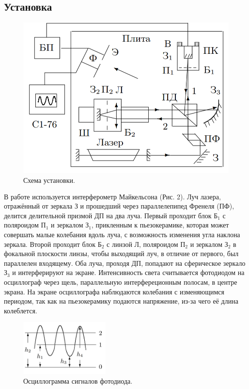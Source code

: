 \documentclass[a4paper,12pt]{article}
\begin{document}
\subsection*{Установка}
\begin{figure}[h]
\includegraphics[scale=0.55]{2.png}
\centering
\caption{Схема установки.}
\end{figure}
В работе используется интерферометр Майкельсона (Рис. 2). Луч лазера, отражённый от зеркала З и прошедший через параллелепипед Френеля (ПФ), делится делительной призмой ДП на два луча. Первый проходит блок $\text{Б}_1$ с поляроидом $\text{П}_1$ и зеркалом $\text{З}_1$, прикленным к пьезокерамике, которая может совершать малые колебания вдоль луча, с возможность изменения угла наклона зеркала. Второй проходит блок $\text{Б}_2$ с линзой Л, поляроидом $\text{П}_2$ и зеркалом $\text{З}_2$ в фокальной плоскости линзы, чтобы выходящий луч, в отличие от первого, был параллелен входящему. Оба луча, проходя ДП, попадают на сферическое зеркало $\text{З}_3$ и интерферируют на экране. Интенсивность света считывается фотодиодом на осциллограф через щель, параллельную интерфереционным полосам, в центре экрана. На экране осциллографа наблюдаются колебания с изменяющимся периодом, так как на пьезокерамику подаются напряжение, из-за чего её длина колеблется.
\begin{figure}
\begin{center}
\includegraphics[width = 0.4\textwidth]{3.png}
\vspace{-40pt}
\end{center}
\caption{Осциллограмма сигналов фотодиода.}
\end{figure}
\end{document}
